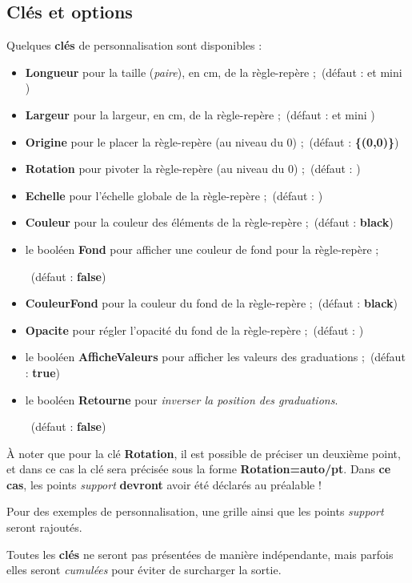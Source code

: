 \documentclass[french,a4paper,11pt]{article}
\newcommand\Cle[1]{{\bfseries\sffamily\textlangle #1\textrangle}}
\begin{document}
\subsection{Clés et options}
%
\begin{tipblock}
Quelques \Cle{clés} de personnalisation sont disponibles :

\begin{itemize}
	\item \Cle{Longueur} pour la taille (\textit{paire}), en cm, de la règle-repère ;\hfill~(défaut : \Cle{12} et mini \Cle{4})
	\item \Cle{Largeur} pour la largeur, en cm, de la règle-repère ;\hfill~(défaut : \Cle{4} et mini \Cle{4})
	\item \Cle{Origine} pour le placer la règle-repère (au niveau du $0$) ;\hfill~(défaut : \Cle{\{(0,0)\}})
	\item \Cle{Rotation} pour pivoter la règle-repère (au niveau du $0$) ;\hfill~(défaut : \Cle{0})
	\item \Cle{Echelle} pour l'échelle globale de la règle-repère ;\hfill~(défaut : \Cle{1})
	\item \Cle{Couleur} pour la couleur des éléments de la règle-repère ;\hfill~(défaut : \Cle{black})
	\item le booléen \Cle{Fond} pour afficher une couleur de fond pour la règle-repère ;
	
	\hfill~(défaut : \Cle{false})
	\item \Cle{CouleurFond} pour la couleur du fond de la règle-repère ;\hfill~(défaut : \Cle{black})
	\item \Cle{Opacite} pour régler l'opacité du fond de la règle-repère ;\hfill~(défaut : \Cle{0.5})
	\item le booléen \Cle{AfficheValeurs} pour afficher les valeurs des graduations ;\hfill~(défaut : \Cle{true})
	\item le booléen \Cle{Retourne} pour \textit{inverser la position des graduations}.
	
	\hfill~(défaut : \Cle{false})
\end{itemize}

À noter que pour la clé \Cle{Rotation}, il est possible de préciser un deuxième point, et dans ce cas la clé sera précisée sous la forme \Cle{Rotation=auto/pt}. Dans \textbf{ce cas}, les points \textit{support} \textbf{devront} avoir été déclarés au préalable !
\end{tipblock}

\begin{noteblock}
Pour des exemples de personnalisation, une grille ainsi que les points \textit{support} seront rajoutés.

\smallskip

Toutes les \Cle{clés} ne seront pas présentées de manière indépendante, mais parfois elles seront \textit{cumulées} pour éviter de surcharger la sortie.
\end{noteblock}
\end{document}
